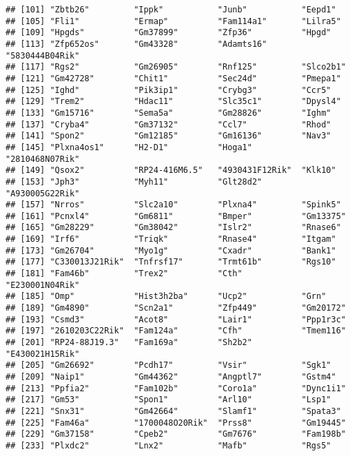 \documentclass[
]{article}
\begin{document}
\begin{verbatim}
## [101] "Zbtb26"         "Ippk"           "Junb"           "Eepd1"         
## [105] "Fli1"           "Ermap"          "Fam114a1"       "Lilra5"        
## [109] "Hpgds"          "Gm37899"        "Zfp36"          "Hpgd"          
## [113] "Zfp652os"       "Gm43328"        "Adamts16"       "5830444B04Rik" 
## [117] "Rgs2"           "Gm26905"        "Rnf125"         "Slco2b1"       
## [121] "Gm42728"        "Chit1"          "Sec24d"         "Pmepa1"        
## [125] "Ighd"           "Pik3ip1"        "Crybg3"         "Ccr5"          
## [129] "Trem2"          "Hdac11"         "Slc35c1"        "Dpysl4"        
## [133] "Gm15716"        "Sema5a"         "Gm28826"        "Ighm"          
## [137] "Cryba4"         "Gm37132"        "Ccl7"           "Rhod"          
## [141] "Spon2"          "Gm12185"        "Gm16136"        "Nav3"          
## [145] "Plxna4os1"      "H2-D1"          "Hoga1"          "2810468N07Rik" 
## [149] "Qsox2"          "RP24-416M6.5"   "4930431F12Rik"  "Klk10"         
## [153] "Jph3"           "Myh11"          "Glt28d2"        "A930005G22Rik" 
## [157] "Nrros"          "Slc2a10"        "Plxna4"         "Spink5"        
## [161] "Pcnxl4"         "Gm6811"         "Bmper"          "Gm13375"       
## [165] "Gm28229"        "Gm38042"        "Islr2"          "Rnase6"        
## [169] "Irf6"           "Triqk"          "Rnase4"         "Itgam"         
## [173] "Gm26704"        "Myo1g"          "Cxadr"          "Bank1"         
## [177] "C330013J21Rik"  "Tnfrsf17"       "Trmt61b"        "Rgs10"         
## [181] "Fam46b"         "Trex2"          "Cth"            "E230001N04Rik" 
## [185] "Omp"            "Hist3h2ba"      "Ucp2"           "Grn"           
## [189] "Gm4890"         "Scn2a1"         "Zfp449"         "Gm20172"       
## [193] "Csmd3"          "Acot8"          "Lair1"          "Ppp1r3c"       
## [197] "2610203C22Rik"  "Fam124a"        "Cfh"            "Tmem116"       
## [201] "RP24-88J19.3"   "Fam169a"        "Sh2b2"          "E430021H15Rik" 
## [205] "Gm26692"        "Pcdh17"         "Vsir"           "Sgk1"          
## [209] "Naip1"          "Gm44362"        "Angptl7"        "Gstm4"         
## [213] "Ppfia2"         "Fam102b"        "Coro1a"         "Dync1i1"       
## [217] "Gm53"           "Spon1"          "Arl10"          "Lsp1"          
## [221] "Snx31"          "Gm42664"        "Slamf1"         "Spata3"        
## [225] "Fam46a"         "1700048O20Rik"  "Prss8"          "Gm19445"       
## [229] "Gm37158"        "Cpeb2"          "Gm7676"         "Fam198b"       
## [233] "Plxdc2"         "Lnx2"           "Mafb"           "Rgs5"          

\end{verbatim}
\end{document}

